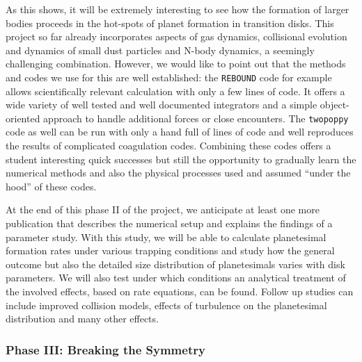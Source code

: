 \documentclass[10pt,fleqn,twoside]{article}
\newcommand{\twopoppy}{\texttt{twopoppy}\xspace}
\newcommand{\rebound}{\texttt{REBOUND}\xspace}
\begin{document}
As this shows, it will be extremely interesting to see how the
formation of larger bodies proceeds in the hot-spots of planet
formation in transition disks. This project so far already
incorporates aspects of gas dynamics, collisional evolution and
dynamics of small dust particles and N-body dynamics, a seemingly
challenging combination. However, we would like to point out that the
methods and codes we use for this are well established: the \rebound
code for example allows scientifically relevant calculation with only
a few lines of code. It offers a wide variety of well tested and well
documented integrators and a simple object-oriented approach to handle
additional forces or close encounters. The \twopoppy code as well can
be run with only a hand full of lines of code and well reproduces the
results of complicated coagulation codes. Combining these codes offers
a student interesting quick successes but still the opportunity to
gradually learn the numerical methods and also the physical processes
used and assumed ``under the hood'' of these codes.

At the end of this phase II of the project, we anticipate at least one
more publication that describes the numerical setup and explains the
findings of a parameter study. With this study, we will be able to
calculate planetesimal formation rates under various trapping
conditions and study how the general outcome but also the detailed
size distribution of planetesimals varies with disk parameters. We
will also test under which conditions an analytical treatment of the
involved effects, based on rate equations, can be found. Follow up
studies can include improved collision models, effects of turbulence
on the planetesimal distribution and many other effects.

\subsubsection{Phase III: Breaking the Symmetry}
\label{sec:phaseIII}
\end{document}
